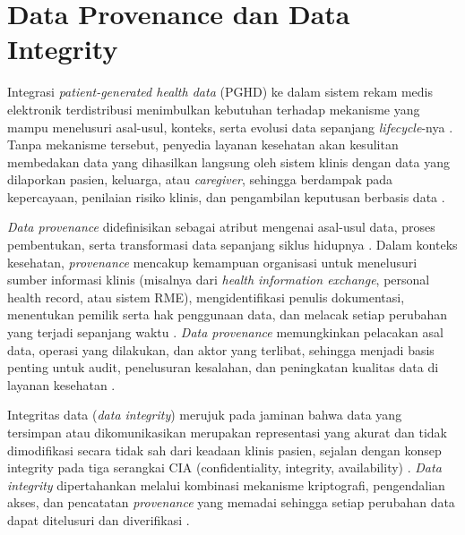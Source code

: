\section{Data Provenance dan Data Integrity}\label{sec:data-provenance-integrity}

Integrasi \textit{patient-generated health data} (PGHD) ke dalam sistem rekam medis elektronik terdistribusi menimbulkan kebutuhan terhadap mekanisme yang mampu menelusuri asal-usul, konteks, serta evolusi data sepanjang \textit{lifecycle}-nya \parencite{ahima_fountain_2014_using_pghd_provenance,Ahmed_2023_Data_Provenance}.
Tanpa mekanisme tersebut, penyedia layanan kesehatan akan kesulitan membedakan data yang dihasilkan langsung oleh sistem klinis dengan data yang dilaporkan pasien, keluarga, atau \textit{caregiver}, sehingga berdampak pada kepercayaan, penilaian risiko klinis, dan pengambilan keputusan berbasis data \parencite{ahima_fountain_2014_using_pghd_provenance,Ahmed_2023_Data_Provenance}.


\textit{Data provenance} didefinisikan sebagai atribut mengenai asal-usul data, proses pembentukan, serta transformasi data sepanjang siklus hidupnya \parencite{Ahmed_2023_Data_Provenance,jaigirdar_prov_iot_2020}.
Dalam konteks kesehatan, \textit{provenance} mencakup kemampuan organisasi untuk menelusuri sumber informasi klinis (misalnya dari \textit{health information exchange}, personal health record, atau sistem RME), mengidentifikasi penulis dokumentasi, menentukan pemilik serta hak penggunaan data, dan melacak setiap perubahan yang terjadi sepanjang waktu \parencite{ahima_fountain_2014_using_pghd_provenance,Ahmed_2023_Data_Provenance}.
\textit{Data provenance} memungkinkan pelacakan asal data, operasi yang dilakukan, dan aktor yang terlibat, sehingga menjadi basis penting untuk audit, penelusuran kesalahan, dan peningkatan kualitas data di layanan kesehatan \parencite{Ahmed_2023_Data_Provenance}.

Integritas data (\textit{data integrity}) merujuk pada jaminan bahwa data yang tersimpan atau dikomunikasikan merupakan representasi yang akurat dan tidak dimodifikasi secara tidak sah dari keadaan klinis pasien, sejalan dengan konsep integrity pada tiga serangkai CIA (confidentiality, integrity, availability) \parencite{jaigirdar_securityaware_2023,gowthamani_edgecrypto_2025}.
\textit{Data integrity} dipertahankan melalui kombinasi mekanisme kriptografi, pengendalian akses, dan pencatatan \textit{provenance} yang memadai sehingga setiap perubahan data dapat ditelusuri dan diverifikasi \parencite{Ahmed_2023_Data_Provenance,jaigirdar_securityaware_2023}.

